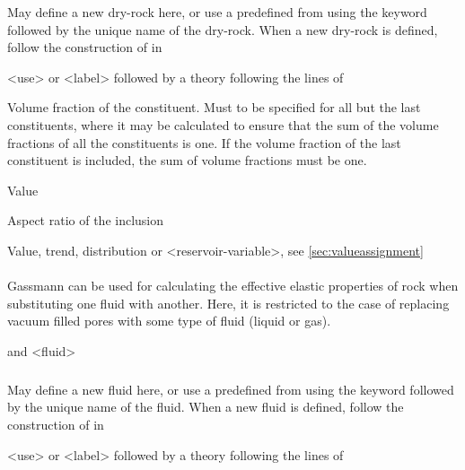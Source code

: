 {
 \slist
   \item \Description  May define a new dry-rock here, or use a predefined  from  using the keyword  followed by the unique name of the dry-rock. When a new dry-rock is defined, follow the construction of  in 
   \item \Argument <use> or <label> followed by a theory following the lines of 
   \item \Default
 \elist

 \slist
   \item \Description Volume fraction of the constituent. Must to be specified for all but the last constituents, where it may be calculated to ensure that the sum of the volume fractions of all the constituents is one. If the volume fraction of the last constituent is included, the sum of volume fractions must be one. 
   \item \Argument Value
   \item \Default
 \elist

 \slist
   \item \Description Aspect ratio of the inclusion
   \item \Argument Value, trend, distribution or <reservoir-variable>, see \autoref{sec:valueassignment}
   \item \Default
 \elist

\paragraph{}
 \slist
   \item \Description Gassmann can be used for calculating the effective elastic properties of rock when substituting one fluid with another. Here, it is restricted to the case of replacing vacuum filled pores with some type of fluid (liquid or gas). 
   \item {} and <fluid>
   \item \Default 
 \elist

\subparagraph{}
 \slist
   \item \Description May define a new fluid here, or use a predefined  from  using the keyword  followed by the unique name of the fluid. When a new fluid is defined, follow the construction of  in 
   \item \Argument <use> or <label> followed by a theory following the lines of 
   \item \Default
 \elist

}
